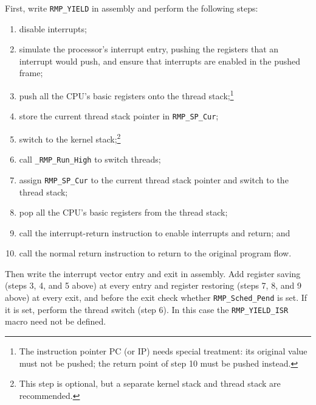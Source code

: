 First, write \texttt{RMP\_YIELD} in assembly and perform the following steps:

\begin{enumerate}
    \item disable interrupts;
    \item simulate the processor's interrupt entry, pushing the registers that an interrupt would push, and ensure that interrupts are enabled in the pushed frame;
    \item push all the CPU's basic registers onto the thread stack;\footnote{The instruction pointer PC (or IP) needs special treatment: its original value must not be pushed; the return point of step 10 must be pushed instead.}
    \item store the current thread stack pointer in \texttt{RMP\_SP\_Cur};
    \item switch to the kernel stack;\footnote{This step is optional, but a separate kernel stack and thread stack are recommended.}
    \item call \texttt{\_RMP\_Run\_High} to switch threads;
    \item assign \texttt{RMP\_SP\_Cur} to the current thread stack pointer and
    switch to the thread stack;
    \item pop all the CPU's basic registers from the thread stack;
    \item call the interrupt-return instruction to enable interrupts and return;
    and
    \item call the normal return instruction to return to the original program
    flow.
\end{enumerate}

Then write the interrupt vector entry and exit in assembly.
Add register saving (steps 3, 4, and 5 above) at every entry and register restoring (steps 7, 8, and 9 above) at every exit, and before the exit check whether \texttt{RMP\_Sched\_Pend} is set.
If it is set, perform the thread switch (step 6).
In this case the \texttt{RMP\_YIELD\_ISR} macro need not be defined.

